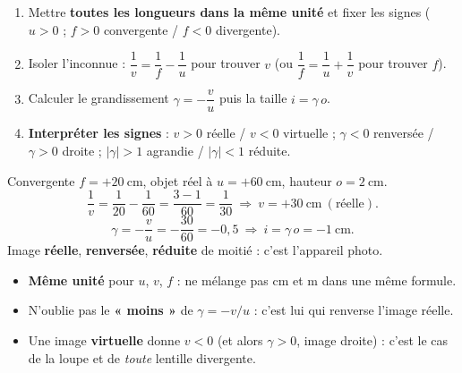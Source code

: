 \documentclass[11pt,a4paper]{article}
\begin{document}
\begin{methode}
\begin{enumerate}[leftmargin=1.7em,topsep=2pt,itemsep=1pt]
  \item Mettre \textbf{toutes les longueurs dans la même unité} et fixer les signes ($u>0$ ;
        $f>0$ convergente / $f<0$ divergente).
  \item Isoler l'inconnue : $\dfrac{1}{v}=\dfrac{1}{f}-\dfrac{1}{u}$ pour trouver $v$
        (ou $\dfrac{1}{f}=\dfrac{1}{u}+\dfrac{1}{v}$ pour trouver $f$).
  \item Calculer le grandissement $\gamma=-\dfrac{v}{u}$ puis la taille $i=\gamma\,o$.
  \item \textbf{Interpréter les signes} : $v>0$ réelle / $v<0$ virtuelle ; $\gamma<0$ renversée /
        $\gamma>0$ droite ; $|\gamma|>1$ agrandie / $|\gamma|<1$ réduite.
\end{enumerate}
\end{methode}

\begin{exemplebox}
Convergente $f=+\qty{20}{\cm}$, objet réel à $u=+\qty{60}{\cm}$, hauteur $o=\qty{2}{\cm}$.
\[ \frac{1}{v}=\frac{1}{20}-\frac{1}{60}=\frac{3-1}{60}=\frac{1}{30}\ \Rightarrow\ v=+\qty{30}{\cm}\ (\text{réelle}). \]
\[ \gamma=-\frac{v}{u}=-\frac{30}{60}=-0{,}5\ \Rightarrow\ i=\gamma\,o=-\qty{1}{\cm}. \]
Image \textbf{réelle}, \textbf{renversée}, \textbf{réduite} de moitié : c'est l'appareil photo.
\end{exemplebox}

\begin{piege}
\begin{itemize}[leftmargin=1.5em,topsep=2pt,itemsep=1pt]
  \item \textbf{Même unité} pour $u$, $v$, $f$ : ne mélange pas cm et m dans une même formule.
  \item N'oublie pas le \textbf{« moins »} de $\gamma=-v/u$ : c'est lui qui renverse l'image réelle.
  \item Une image \textbf{virtuelle} donne $v<0$ (et alors $\gamma>0$, image droite) : c'est le cas de
        la loupe et de \emph{toute} lentille divergente.
\end{itemize}
\end{piege}
\end{document}
